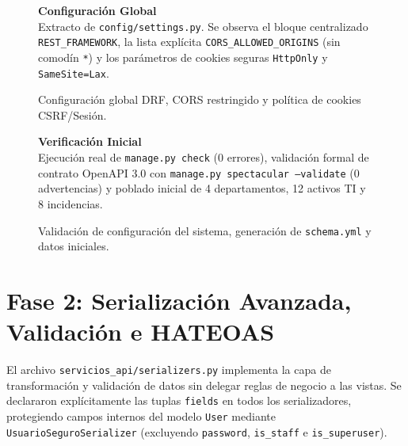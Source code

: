 \documentclass[10pt,a4paper]{article}
\begin{document}
\begin{figure}[H]
\centering
\begin{minipage}[c]{0.73\textwidth}
    \centering
\end{minipage}\hfill
\begin{minipage}[c]{0.24\textwidth}
    \raggedright
    \textbf{\color{uncpnavy}\small Configuración Global}\\[4pt]
    \footnotesize
    \color{uncpdark}
    Extracto de \texttt{config/settings.py}. Se observa el bloque centralizado \texttt{REST\_FRAMEWORK}, la lista explícita \texttt{CORS\_ALLOWED\_ORIGINS} (sin comodín \texttt{*}) y los parámetros de cookies seguras \texttt{HttpOnly} y \texttt{SameSite=Lax}.
\end{minipage}
\vspace{-0.2cm}
\caption{Configuración global DRF, CORS restringido y política de cookies CSRF/Sesión.}
\label{fig:codesnap_settings}
\end{figure}

\begin{figure}[H]
\centering
\begin{minipage}[c]{0.73\textwidth}
    \centering
\end{minipage}\hfill
\begin{minipage}[c]{0.24\textwidth}
    \raggedright
    \textbf{\color{uncpnavy}\small Verificación Inicial}\\[4pt]
    \footnotesize
    \color{uncpdark}
    Ejecución real de \texttt{manage.py check} (0 errores), validación formal de contrato OpenAPI 3.0 con \texttt{manage.py spectacular --validate} (0 advertencias) y poblado inicial de 4 departamentos, 12 activos TI y 8 incidencias.
\end{minipage}
\vspace{-0.2cm}
\caption{Validación de configuración del sistema, generación de \texttt{schema.yml} y datos iniciales.}
\label{fig:term_setup}
\end{figure}

\newpage

\section{Fase 2: Serialización Avanzada, Validación e HATEOAS}
El archivo \texttt{servicios\_api/serializers.py} implementa la capa de transformación y validación de datos sin delegar reglas de negocio a las vistas. Se declararon explícitamente las tuplas \texttt{fields} en todos los serializadores, protegiendo campos internos del modelo \texttt{User} mediante \texttt{UsuarioSeguroSerializer} (excluyendo \texttt{password}, \texttt{is\_staff} e \texttt{is\_superuser}).
\end{document}
